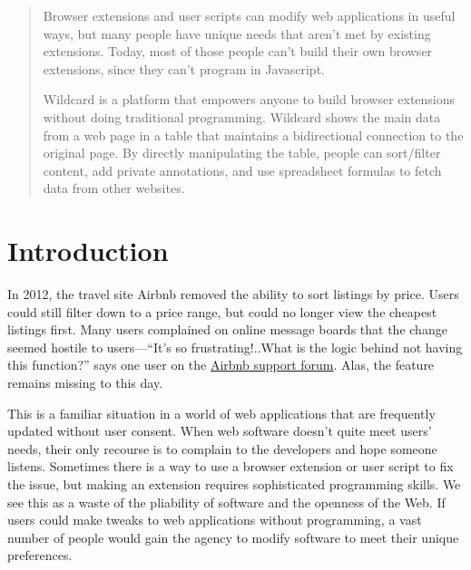 \documentclass[english,submission]{programming}
\begin{document}
\begin{abstract}
Browser extensions and user scripts can modify web applications in
useful ways, but many people have unique needs that aren't met by
existing extensions. Today, most of those people can't build their own
browser extensions, since they can't program in Javascript.

Wildcard is a platform that empowers anyone to build browser extensions
without doing traditional programming. Wildcard shows the main data from
a web page in a table that maintains a bidirectional connection to the
original page. By directly manipulating the table, people can
sort/filter content, add private annotations, and use spreadsheet
formulas to fetch data from other websites.
\end{abstract}


\hypertarget{introduction}{%
\section{Introduction}\label{introduction}}

In 2012, the travel site Airbnb removed the ability to sort listings by
price. Users could still filter down to a price range, but could no
longer view the cheapest listings first. Many users complained on online
message boards that the change seemed hostile to users---``It's so
frustrating!..What is the logic behind not having this function?'' says
one user on the
\href{https://community.withairbnb.com/t5/Hosting/Sorting-listing-by-price/td-p/559404}{Airbnb
support forum}. Alas, the feature remains missing to this day.

This is a familiar situation in a world of web applications that are
frequently updated without user consent. When web software doesn't quite
meet users' needs, their only recourse is to complain to the developers
and hope someone listens. Sometimes there is a way to use a browser
extension or user script to fix the issue, but making an extension
requires sophisticated programming skills. We see this as a waste of the
pliability of software and the openness of the Web. If users could make
tweaks to web applications without programming, a vast number of people
would gain the agency to modify software to meet their unique
preferences.
\end{document}
